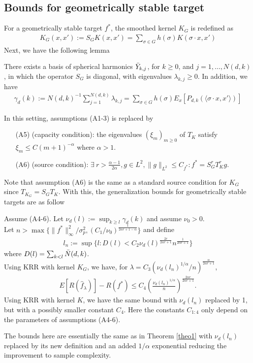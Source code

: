 \subsection{Bounds for geometrically stable target}
For a geometrically stable target $f^*$, the smoothed kernel $K_G$ is redefined as
\begin{align}
    K_G(x,x') := S_GK(x,x') = \sum_{\sigma\in G}h(\sigma)K(\sigma\cdot x,x')
\end{align}
Next, we have the following lemma
\begin{lemma}
    There exists a basis of spherical harmonics $\Bar{Y}_{k,j}$, for $k \ge 0$, and $j = 1,\ldots, N(d, k)$, in which the operator $S_G$ is diagonal, with eigenvalues $\lambda_{k,j}\ge0$. In addition, we have
    \begin{align}
        \gamma_d(k):=N(d,k)^{-1}\sum_{j=1}^{N(d,k)}\lambda_{k,j}=\sum_{\sigma\in G}h(\sigma)E_x[P_{d,k}(\langle \sigma\cdot x,x'\rangle)]
    \end{align}
\end{lemma}
In this setting, assumptions (A1-3) is replaced by 
\begin{enumerate}
    \item[(A5)] (capacity condition): the eigenvalues $(\xi_m)_{m\ge0}$ of $T_K$ satisfy $\xi_m \le C(m + 1)^{-\alpha}$ where $\alpha>1$.
    \item[(A6)] (source condition): $\exists\ r>\frac{\alpha-1}{2\alpha}, g\in L^2, \|g\|_{L^2}\le C_{f^*}:f^*= S_G^rT^r_Kg$.
\end{enumerate}
Note that assumption (A6) is the same as a standard source condition for $K_G$ since $T_{K_G}=S_GT_K$. With this, the generalization bounds for geometrically stable targets are as follow
\begin{theorem}\label{theo2}
    Assume (A4-6). Let $\nu_d(l):= \sup_{k\ge l}\gamma_d(k)$ and assume $\nu_0>0$.\\
    Let $n> \max\{\|f^*\|^2_\infty/\sigma^2_p,(C_1/\nu_0)^{\frac{1}{2\alpha r +1-\alpha}}\}$ and define
    \begin{align}
        l_n:=\sup\{l:D(l)<C_2\nu_d(l)^{\frac{2 r}{2\alpha r +1}}n^{\frac{1}{2\alpha r +1}}\}
    \end{align}
    where $D(l)=\sum_{k<l}\Bar{N}(d,k)$.\\
    Using KRR with kernel $K_G$, we have, for $\lambda=C_3(\nu_d(l_n)^{1/\alpha}/n)^{\frac{\alpha}{2\alpha r +1}}$,
    \begin{align}
        E[R(\hat{f}_\lambda)]-R(f^*)\le C_4\left(\frac{\nu_d(l_n)^{1/\alpha}}{n}\right)^{\frac{2\alpha r}{2\alpha r +1}}.
    \end{align}
    Using KRR with kernel $K$, we have the same bound with $\nu_d(l_n)$ replaced by 1, but with a possibly smaller constant $C_4$. Here the constants $C_{1:4}$ only depend on the parameters of assumptions (A4-6).
\end{theorem}
The bounds here are essentially the same as in Theorem \ref{theo1} with $\nu_d(l_n)$ replaced by its new definition and an added $1/\alpha$ exponential reducing the improvement to sample complexity.

